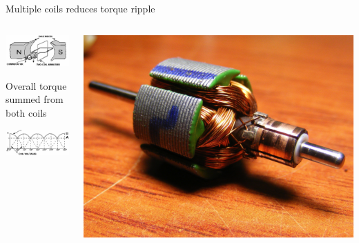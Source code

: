 \documentclass[compress]{beamer}
\begin{document}
\begin{frame}{Multiple coils reduces torque ripple}

    \begin{columns}
        \begin{column}{0.5\linewidth}
            \begin{center}
                \includegraphics[width=\linewidth]{image26}

                \vspace{2em}

                \footnotesize Overall torque summed from both coils

                \includegraphics[width=\linewidth]{image26-2}

            \end{center}
        \end{column}
        \begin{column}{0.5\linewidth}

            \begin{center}
                \includegraphics[width=0.8\linewidth]{image27}


\end{center}
\end{column}
\end{columns}
\end{frame}
\end{document}
